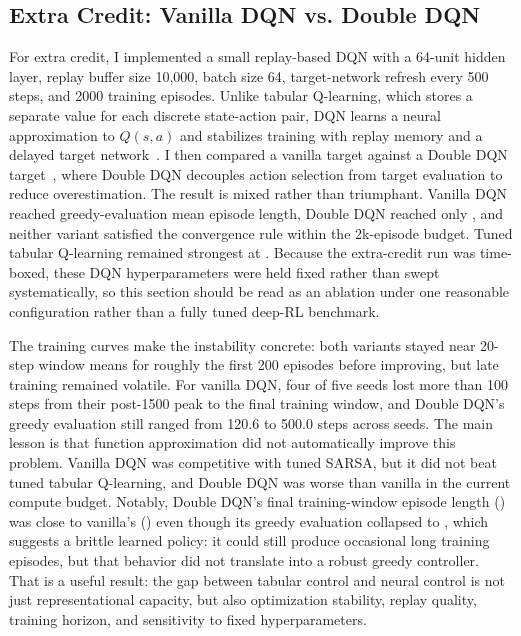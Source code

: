 \documentclass[letterpaper, 10 pt, conference]{ieeeconf}
\begin{document}
\subsection{Extra Credit: Vanilla DQN vs. Double DQN}

For extra credit, I implemented a small replay-based DQN with a 64-unit hidden layer, replay buffer size 10,000, batch size 64, target-network refresh every 500 steps, and 2000 training episodes. Unlike tabular Q-learning, which stores a separate value for each discrete state-action pair, DQN learns a neural approximation to $Q(s,a)$ and stabilizes training with replay memory and a delayed target network~\cite{mnih2015human}. I then compared a vanilla target against a Double DQN target~\cite{vanhasselt2016deep,hessel2018rainbow}, where Double DQN decouples action selection from target evaluation to reduce overestimation. The result is mixed rather than triumphant. Vanilla DQN reached \VanillaDQNEvalEpLen greedy-evaluation mean episode length, Double DQN reached only \DoubleDQNEvalEpLen, and neither variant satisfied the convergence rule within the 2k-episode budget. Tuned tabular Q-learning remained strongest at \DQNQLBaseline. Because the extra-credit run was time-boxed, these DQN hyperparameters were held fixed rather than swept systematically, so this section should be read as an ablation under one reasonable configuration rather than a fully tuned deep-RL benchmark.

\begin{table}[t]
\caption{Extra-credit DQN summary on CartPole.}
\label{tab:dqn}
\centering
\resizebox{\columnwidth}{!}{}
\end{table}

The training curves make the instability concrete: both variants stayed near 20-step window means for roughly the first 200 episodes before improving, but late training remained volatile. For vanilla DQN, four of five seeds lost more than 100 steps from their post-1500 peak to the final training window, and Double DQN's greedy evaluation still ranged from 120.6 to 500.0 steps across seeds. The main lesson is that function approximation did not automatically improve this problem. Vanilla DQN was competitive with tuned SARSA, but it did not beat tuned tabular Q-learning, and Double DQN was worse than vanilla in the current compute budget. Notably, Double DQN's final training-window episode length (\DoubleDQNFinalEpLen) was close to vanilla's (\VanillaDQNFinalEpLen) even though its greedy evaluation collapsed to \DoubleDQNEvalEpLen, which suggests a brittle learned policy: it could still produce occasional long training episodes, but that behavior did not translate into a robust greedy controller. That is a useful result: the gap between tabular control and neural control is not just representational capacity, but also optimization stability, replay quality, training horizon, and sensitivity to fixed hyperparameters.
\end{document}
